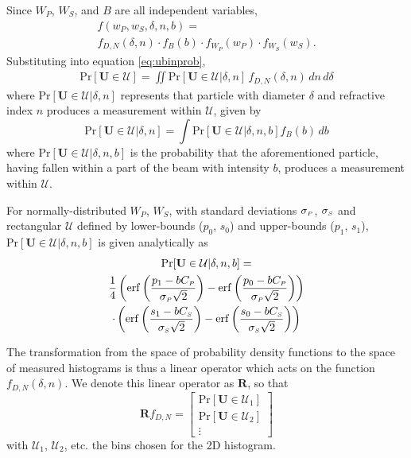\documentclass[journal]{IEEEtran}
\begin{document}
\par Since $W_{\scriptscriptstyle{P}}$, $W_{\scriptscriptstyle{S}}$, and $B$ are all independent variables, 
\begin{multline}
    f(w_{\scriptscriptstyle{P}}, w_{\scriptscriptstyle{S}}, \delta, n, b)=\\
    f_{\scriptscriptstyle{D, N}}(\delta, n)\cdot f_{\scriptscriptstyle{B}}(b)\cdot f_{\scriptscriptstyle{W_{\scriptscriptstyle{P}}}}(w_{\scriptscriptstyle{P}})\cdot
    f_{\scriptscriptstyle{W_{\scriptscriptstyle{S}}}}(w_{\scriptscriptstyle{S}}).
\end{multline}
Substituting into equation \ref{eq:ubinprob},
\begin{multline}\label{eq:ubinprob2}
    \mathrm{Pr}[\mathbf{U}\in \mathcal{U}]=
    \iint \mathrm{Pr}[\mathbf{U}\in\mathcal{U}|\delta, n]\,f_{\scriptscriptstyle{D, N}}(\delta, n)\,dn\,d\delta
\end{multline}
where $\mathrm{Pr}[\mathbf{U}\in\mathcal{U}|\delta, n]$ represents that particle with diameter $\delta$ and refractive index $n$ produces a measurement within $\mathcal{U}$, given by
\begin{equation}
    \mathrm{Pr}[\mathbf{U}\in\mathcal{U}|\delta, n]=\int \mathrm{Pr}[\mathbf{U}\in\mathcal{U}|\delta, n, b]f_{\scriptscriptstyle{B}}(b) \, db
\end{equation}
where $\mathrm{Pr}[\mathbf{U}\in\mathcal{U}|\delta, n, b]$ is the probability that the aforementioned particle, having fallen within a part of the beam with intensity $b$, produces a measurement within $\mathcal{U}$.
\par For normally-distributed $W_{\scriptscriptstyle{P}}$, $W_{\scriptscriptstyle{S}}$, with standard deviations $\sigma_{\scriptscriptstyle{P}}$, $\sigma_{\scriptscriptstyle{S}}$ and rectangular $\mathcal{U}$ defined by lower-bounds ($p_0$, $s_0$) and upper-bounds ($p_1$, $s_1$), $\mathrm{Pr}[\mathbf{U}\in\mathcal{U}|\delta, n, b]$ is given analytically as
\begin{multline}
    \mathrm{Pr}[\mathbf{U}\in\mathcal{U}|\delta, n, b]=\\ \frac{1}{4}\left(\mathrm{erf}\left(\frac{p_1-bC_{\scriptscriptstyle{P}}}{\sigma_{\scriptscriptstyle{P}}\sqrt{2}}\right)-\mathrm{erf}\left(\frac{p_0-bC_{\scriptscriptstyle{P}}}{\sigma_{\scriptscriptstyle{P}}\sqrt{2}}\right)\right)\\
    \cdot\left(\mathrm{erf}\left(\frac{s_1-bC_{\scriptscriptstyle{S}}}{\sigma_{\scriptscriptstyle{S}}\sqrt{2}}\right)-\mathrm{erf}\left(\frac{s_0-bC_{\scriptscriptstyle{S}}}{\sigma_{\scriptscriptstyle{S}}\sqrt{2}}\right)\right)
\end{multline}

The transformation from the space of probability density functions to the space of measured histograms is thus a linear operator which acts on the function $f_{\scriptscriptstyle{D, N}}(\delta, n)$. We denote this linear operator as $\bm{R}$, so that
\begin{equation}
    \bm{R}f_{\scriptscriptstyle{D, N}}=\begin{bmatrix}
        \mathrm{Pr}[\mathbf{U}\in\mathcal{U}_1]\\
        \mathrm{Pr}[\mathbf{U}\in\mathcal{U}_2]\\
        \vdots
    \end{bmatrix}
\end{equation}
with $\mathcal{U}_1$, $\mathcal{U}_2$, etc. the bins chosen for the 2D histogram.
\end{document}
